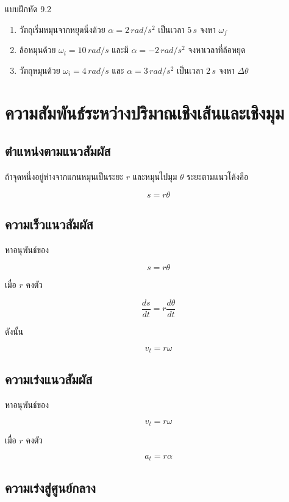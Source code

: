 \begin{exercisebox}{แบบฝึกหัด 9.2}
\begin{enumerate}
    \item วัตถุเริ่มหมุนจากหยุดนิ่งด้วย $\alpha=2\,\si{rad/s^2}$ เป็นเวลา $5\,\si{s}$ จงหา $\omega_f$
    \item ล้อหมุนด้วย $\omega_i=10\,\si{rad/s}$ และมี $\alpha=-2\,\si{rad/s^2}$ จงหาเวลาที่ล้อหยุด
    \item วัตถุหมุนด้วย $\omega_i=4\,\si{rad/s}$ และ $\alpha=3\,\si{rad/s^2}$ เป็นเวลา $2\,\si{s}$ จงหา $\Delta\theta$
\end{enumerate}
\end{exercisebox}

\section{ความสัมพันธ์ระหว่างปริมาณเชิงเส้นและเชิงมุม}

\subsection{ตำแหน่งตามแนวสัมผัส}

ถ้าจุดหนึ่งอยู่ห่างจากแกนหมุนเป็นระยะ $r$ และหมุนไปมุม $\theta$ ระยะตามแนวโค้งคือ

\[
s=r\theta
\]

\subsection{ความเร็วแนวสัมผัส}

หาอนุพันธ์ของ

\[
s=r\theta
\]

เมื่อ $r$ คงตัว

\[
\frac{ds}{dt}=r\frac{d\theta}{dt}
\]

ดังนั้น

\[
v_t=r\omega
\]

\subsection{ความเร่งแนวสัมผัส}

หาอนุพันธ์ของ

\[
v_t=r\omega
\]

เมื่อ $r$ คงตัว

\[
a_t=r\alpha
\]

\subsection{ความเร่งสู่ศูนย์กลาง}

